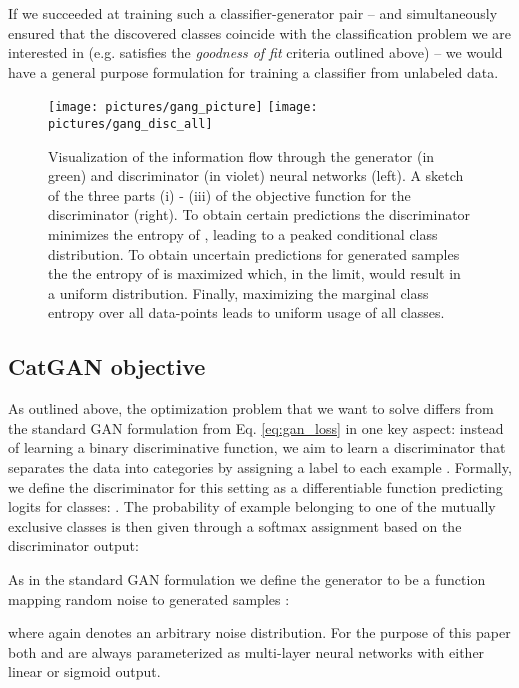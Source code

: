 \documentclass{article} \usepackage{iclr2016_conference,times}
\begin{document}
If we succeeded at training such a classifier-generator pair --
and simultaneously ensured that the discovered  classes
coincide with the classification problem we are interested in
(e.g.  satisfies the \emph{goodness of fit} criteria outlined above) -- we
would have a general purpose formulation for training a classifier
from unlabeled data.

\begin{figure}
  \centering
  \texttt{[image: pictures/gang\_picture]} 
  \quad \quad
  \vline
  \quad \quad
\texttt{[image: pictures/gang\_disc\_all]}
\caption{Visualization of the information flow through the
      generator (in green) and discriminator (in violet) neural networks (left). A sketch
      of the three parts (i) - (iii) of the objective function  for the
      discriminator (right). To obtain certain predictions the
      discriminator minimizes the entropy of , leading
      to a peaked conditional class distribution. To obtain uncertain
      predictions for generated samples the the entropy of  is maximized which, in the limit, would result in a uniform
      distribution. Finally, maximizing the marginal class entropy
      over all data-points leads to uniform usage of all classes.}
  \label{fig:reqs}
\end{figure}

\subsection{CatGAN objective}
\label{sect:objective}
As outlined above, the optimization problem that we want to solve
differs from the standard GAN formulation from Eq. \eqref{eq:gan_loss}
in one key aspect: instead of learning a binary discriminative
function, we aim to learn a discriminator that separates the data into
 categories by assigning a label  to each example
. Formally, we define the discriminator  for this setting
as a differentiable function predicting logits for  classes:
. The probability of example  belonging
to one of the  mutually exclusive classes is then given through a
softmax assignment based on the discriminator output:


As in the standard GAN formulation we define the generator  to
be a function mapping random noise  to generated 
samples :

where  again denotes an arbitrary noise distribution. For the
purpose of this paper both  and  are always parameterized as multi-layer
neural networks with either linear or sigmoid output. 
\end{document}
